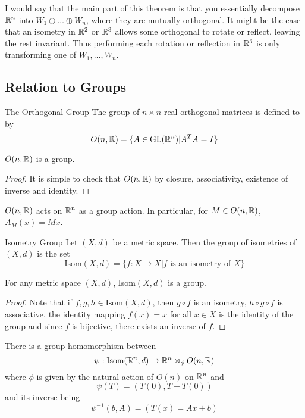 \documentclass[a4paper]{article}
\begin{document}
I would say that the main part of this theorem is that you essentially decompose $\mathbb{R}^n$ into $W_1\oplus\dots\oplus W_n$, where they are mutually orthogonal. It might be the case that an isometry in $\mathbb{R}^2$ or $\mathbb{R}^3$ allows some orthogonal to rotate or reflect, leaving the rest invariant. Thus performing each rotation or reflection in $\mathbb{R}^3$ is only transforming one of $W_1,\dots,W_n$. 

\subsection{Relation to Groups}
\begin{defn}{The Orthogonal Group}{} The group of $n\times n$ real orthogonal matrices is defined to by $$O(n,\mathbb{R})=\{A\in\text{GL}(\mathbb{R}^n)|A^TA=I\}$$
\end{defn}

\begin{lmm}{}{} $O(n,\mathbb{R})$ is a group. \tcbline
\begin{proof} It is simple to check that $O(n,\mathbb{R})$ by closure, associativity, existence of inverse and identity. 
\end{proof}
\end{lmm}

\begin{prp}{}{} $O(n,\mathbb{R})$ acts on $\mathbb{R}^n$ as a group action. In particular, for $M\in O(n,\mathbb{R})$, $A_M(x)=Mx$. 
\end{prp}

\begin{defn}{Isometry Group}{} Let $(X,d)$ be a metric space. Then the group of isometries of $(X,d)$ is the set $$\text{Isom}(X,d)=\{f:X\to X|f \text{ is an isometry of }X\}$$
\end{defn}

\begin{lmm}{}{} For any metric space $(X,d)$, Isom$(X,d)$ is a group. \tcbline
\begin{proof} Note that if $f,g,h\in\text{Isom}(X,d)$, then $g\circ f$ is an isometry, $h\circ g\circ f$ is associative, the identity mapping $f(x)=x$ for all $x\in X$ is the identity of the group and since $f$ is bijective, there exists an inverse of $f$. 
\end{proof}
\end{lmm}

\begin{thm}{}{} There is a group homomorphism between $$\psi:\text{Isom}(\mathbb{R}^n,d)\to \mathbb{R}^n\rtimes_\phi O(n,\mathbb{R})$$ where $\phi$ is given by the natural action of $O(n)$ on $\mathbb{R}^n$ and $$\psi(T)=(T(0),T-T(0))$$ and its inverse being $$\psi^{-1}(b,A)=\left(T(x)=Ax+b\right)$$
\end{thm}
\end{document}
